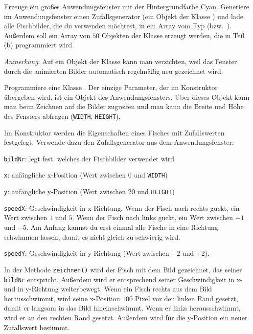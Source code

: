 \begin{compactenum}[a)]
\item Erzeuge ein großes Anwendungsfenster mit der Hintergrundfarbe Cyan.
Generiere im Anwendungsfenster einen Zufallsgenerator (ein Objekt der Klasse
) und lade alle Fischbilder, die du verwenden möchtest, in ein
Array vom Typ  (bzw.\ ). Außerdem soll ein
Array von $50$ Objekten der Klasse  erzeugt werden, die in Teil (b)
programmiert wird.

\emph{Anmerkung}: Auf ein Objekt der Klasse  kann man verzichten,
weil das Fenster durch die animierten Bilder automatisch regelmäßig neu
gezeichnet wird.

\item Programmiere eine Klasse . Der einzige Parameter, der im
Konstruktor übergeben wird, ist ein Objekt des Anwendungsfensters. Über dieses
Objekt kann man beim Zeichnen auf die Bilder zugreifen und man kann die Breite
und Höhe des Fensters abfragen (\lstinline|WIDTH|, \lstinline|HEIGHT|).

Im Konstruktor werden die Eigenschaften eines Fisches mit Zufallswerten
festgelegt. Verwende dazu den Zufallsgenerator aus dem Anwendungsfenster:

\begin{compactitem}
\item \lstinline|bildNr|: legt fest, welches der Fischbilder verwendet wird
\item \lstinline|x|: anfängliche x-Position (Wert zwischen $0$ und
\lstinline|WIDTH|)
\item \lstinline|y|: anfängliche y-Position (Wert zwischen $20$ und
\lstinline|HEIGHT|)
\item \lstinline|speedX|: Geschwindigkeit in x-Richtung. Wenn der Fisch nach
rechts guckt, ein Wert zwischen $1$ und $5$. Wenn der Fisch nach links guckt, ein
Wert zwischen $-1$ und $-5$. Am Anfang kannst du erst einmal alle Fische in eine
Richtung schwimmen lassen, damit es nicht gleich zu schwierig wird.
\item \lstinline|speedY|: Geschwindigkeit in y-Richtung (Wert zwischen $-2$ und
$+2$).
\end{compactitem}

In der Methode \lstinline|zeichnen()| wird der Fisch mit dem Bild gezeichnet,
das seiner \lstinline|bildNr| entspricht. Außerdem wird er entsprechend seiner
Geschwindigkeit in x- und in y-Richtung weiterbewegt. Wenn ein Fisch rechts
aus dem Bild herausschwimmt, wird seine x-Position $100$ Pixel vor den linken
Rand gesetzt, damit er langsam in das Bild hineinschwimmt. Wenn er links
herausschwimmt, wird er an den rechten Rand gesetzt. Außerdem wird für die
y-Position ein neuer Zufallswert bestimmt.
\end{compactenum}


